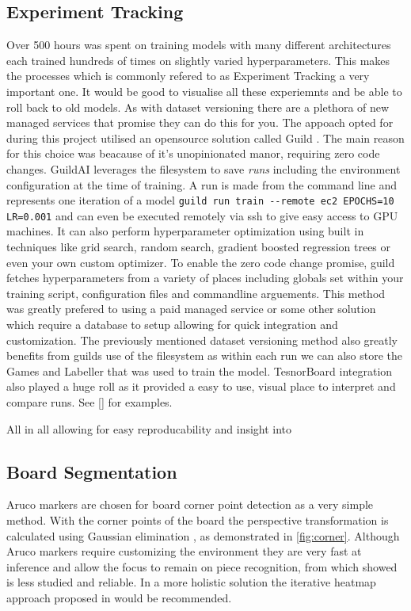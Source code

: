\subsection{Experiment Tracking}
Over 500 hours was spent on training models with many different architectures each trained hundreds of times
on slightly varied hyperparameters.  This makes the processes which is commonly refered to as Experiment Tracking a very important one.
It would be good to visualise all these experiemnts and be able to roll back to old models.  As with dataset versioning there are a plethora of 
new managed services that promise they can do this for you.
The appoach opted for during this project utilised an opensource solution called Guild \cite{}.  The main reason for this choice was beacause of 
it's unopinionated manor, requiring zero code changes.  GuildAI leverages the filesystem to save \textit{runs} including the environment configuration
at the time of training.  A run is made from the command line and
represents one iteration of a model \verb|guild run train --remote ec2 EPOCHS=10 LR=0.001| and can even be executed remotely via ssh to give easy access to 
GPU machines.  It can also perform hyperparameter optimization using built in techniques like grid search, random search, gradient boosted regression trees 
or even your own custom optimizer.  To enable the zero code change promise, guild fetches hyperparameters from a variety of places including globals set within 
your training script, configuration files and commandline arguements.
This method was greatly prefered to using a paid managed service or some other solution which require a database to setup allowing for quick integration and
customization.  The previously mentioned dataset versioning method also greatly benefits from guilds use of the filesystem as within each run we can also store 
the Games and Labeller that was used to train the model. 
TesnorBoard integration also played a huge roll as it provided a easy to use, visual place to interpret and compare runs.  See \autoref{}
for examples.

All in all allowing for easy reproducability and insight into 


\subsection{Board Segmentation}
Aruco markers are chosen for board corner point detection as a very simple method.
With the corner points of the board the perspective transformation is calculated using
Gaussian elimination \cite{gauss}, as demonstrated in \autoref{fig:corner}.
Although Aruco markers require customizing the environment they are very fast at 
inference and allow the focus to remain on piece recognition, from which
 showed is less studied and reliable.  In a more holistic solution the 
iterative heatmap approach proposed in \cite{heatmap} would be recommended.


